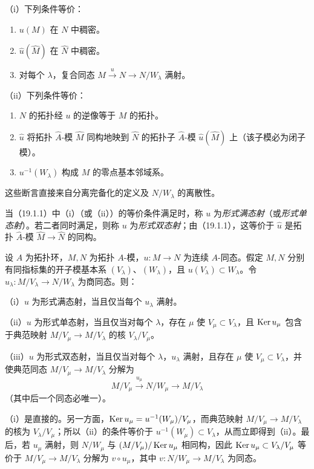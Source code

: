 （i）下列条件等价：
\begin{enumerate}[label=\alph*)]
\item $u(M)$ 在 $N$ 中稠密。
\item[$a'$）] $\widehat u(\widehat M)$ 在 $\widehat N$ 中稠密。
\item[$a''$）] 对每个 $\lambda$，复合同态 $M\xrightarrow{u}N\to N/W_\lambda$ 满射。
\end{enumerate}
（ii）下列条件等价：
\begin{enumerate}[label=\alph*),start=2]
\item $N$ 的拓扑经 $u$ 的逆像等于 $M$ 的拓扑。
\item[$b'$）] $\widehat u$ 将拓扑 $\widehat A$-模 $\widehat M$ 同构地映到 $\widehat N$ 的拓扑子 $\widehat A$-模 $\widehat u(\widehat M)$ 上（该子模必为闭子模）。
\item[$b''$）] $u^{-1}(W_\lambda)$ 构成 $M$ 的零点基本邻域系。
\end{enumerate}
这些断言直接来自分离完备化的定义及 $N/W_\lambda$ 的离散性。

当（19.1.1）中（i）（或（ii））的等价条件满足时，称 $u$ 为\emph{形式满态射}（或\emph{形式单态射}）。若二者同时满足，则称 $u$ 为\emph{形式双态射}；由（19.1.1），这等价于 $\widehat u$ 是拓扑 $\widehat A$-模 $\widehat M\to\widehat N$ 的同构。

设 $A$ 为拓扑环，$M,N$ 为拓扑 $A$-模，$u:M\to N$ 为连续 $A$-同态。假定 $M,N$ 分别有同指标集的开子模基本系 $(V_\lambda)$、$(W_\lambda)$，且 $u(V_\lambda)\subset W_\lambda$。令 $u_\lambda:M/V_\lambda\to N/W_\lambda$ 为商同态。则：

（i）$u$ 为形式满态射，当且仅当每个 $u_\lambda$ 满射。

（ii）$u$ 为形式单态射，当且仅当对每个 $\lambda$，存在 $\mu$ 使 $V_\mu\subset V_\lambda$，且 $\operatorname{Ker} u_\mu$ 包含于典范映射 $M/V_\mu\to M/V_\lambda$ 的核 $V_\lambda/V_\mu$。

（iii）$u$ 为形式双态射，当且仅当对每个 $\lambda$，$u_\lambda$ 满射，且存在 $\mu$ 使 $V_\mu\subset V_\lambda$，并使典范同态 $M/V_\mu\to M/V_\lambda$ 分解为
\[
 M/V_\mu\xrightarrow{u_\mu}N/W_\mu\longrightarrow M/V_\lambda
\]
（其中后一个同态必唯一）。

（i）是直接的。另一方面，$\operatorname{Ker} u_\mu=u^{-1}(W_\mu)/V_\mu$，而典范映射 $M/V_\mu\to M/V_\lambda$ 的核为 $V_\lambda/V_\mu$；所以（ii）的条件等价于 $u^{-1}(W_\mu)\subset V_\lambda$，从而立即得到（ii）。最后，若 $u_\mu$ 满射，则 $N/W_\mu$ 与 $(M/V_\mu)/\operatorname{Ker} u_\mu$ 相同构，因此 $\operatorname{Ker} u_\mu\subset V_\lambda/V_\mu$ 等价于 $M/V_\mu\to M/V_\lambda$ 分解为 $v\circ u_\mu$，其中 $v:N/W_\mu\to M/V_\lambda$ 为同态。

